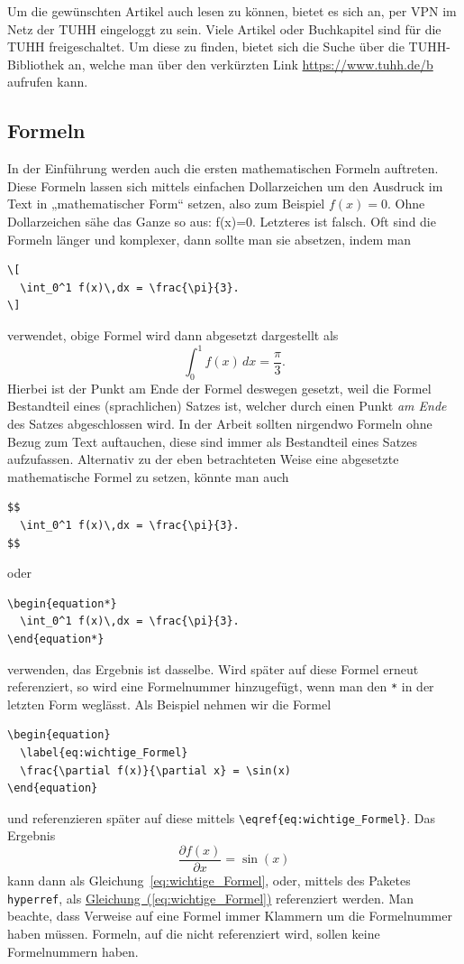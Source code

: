 \documentclass[12pt]{article}
\theoremstyle{definition}
\numberwithin{equation}{section}
\begin{document}
Um die gewünschten Artikel auch lesen zu können, bietet es sich an,
per VPN im Netz der TUHH eingeloggt zu sein. Viele Artikel oder
Buchkapitel sind für die TUHH freigeschaltet. Um diese zu finden,
bietet sich die Suche über die TUHH-Bibliothek an, welche man über den
verkürzten Link \url{https://www.tuhh.de/b} aufrufen kann.

\subsection{Formeln}
\label{sec:Formeln}

In der Einführung werden auch die ersten mathematischen Formeln
auftreten. Diese Formeln lassen sich mittels einfachen Dollarzeichen
um den Ausdruck im Text in „mathematischer Form“ setzen, also zum
Beispiel $f(x)=0$. Ohne Dollarzeichen sähe das Ganze so aus:
f(x)=0. Letzteres ist falsch. Oft sind die Formeln länger und
komplexer, dann sollte man sie absetzen, indem man
\begin{verbatim}
\[
  \int_0^1 f(x)\,dx = \frac{\pi}{3}.
\]
\end{verbatim}
verwendet, obige Formel wird dann abgesetzt dargestellt als
\[
  \int_0^1 f(x)\,dx = \frac{\pi}{3}.
\]
Hierbei ist der Punkt am Ende der Formel deswegen gesetzt, weil die
Formel Bestandteil eines (sprachlichen) Satzes ist, welcher durch
einen Punkt \emph{am Ende} des Satzes abgeschlossen wird. In der
Arbeit sollten nirgendwo Formeln ohne Bezug zum Text auftauchen, diese
sind immer als Bestandteil eines Satzes aufzufassen. Alternativ zu der
eben betrachteten Weise eine abgesetzte mathematische Formel zu
setzen, könnte man auch
\begin{verbatim}
$$
  \int_0^1 f(x)\,dx = \frac{\pi}{3}.
$$
\end{verbatim}
oder
\begin{verbatim}
\begin{equation*}
  \int_0^1 f(x)\,dx = \frac{\pi}{3}.
\end{equation*}
\end{verbatim}
verwenden, das Ergebnis ist dasselbe. Wird später auf diese Formel
erneut referenziert, so wird eine Formelnummer hinzugefügt, wenn man
den \texttt{*} in der letzten Form weglässt. Als Beispiel nehmen wir
die Formel
\begin{verbatim}
\begin{equation}
  \label{eq:wichtige_Formel}
  \frac{\partial f(x)}{\partial x} = \sin(x)
\end{equation}
\end{verbatim}
und referenzieren später auf diese mittels
\verb|\eqref{eq:wichtige_Formel}|. Das Ergebnis
\begin{equation}
  \label{eq:wichtige_Formel}
  \frac{\partial f(x)}{\partial x} = \sin(x)
\end{equation}
kann dann als Gleichung~\eqref{eq:wichtige_Formel}, oder, mittels des
Paketes \texttt{hyperref}, als
\hyperref[eq:wichtige_Formel]{Gleichung~(\ref*{eq:wichtige_Formel})}
referenziert werden. Man beachte, dass Verweise auf eine Formel immer
Klammern um die Formelnummer haben müssen. Formeln, auf die nicht
referenziert wird, sollen keine Formelnummern haben.
\end{document}
